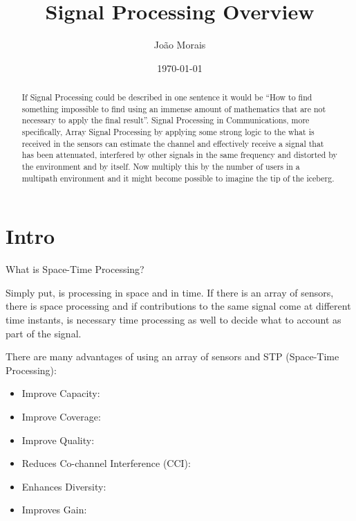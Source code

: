 \documentclass[12pt, a4paper]{article}
\title{Signal Processing Overview}
\author{
    João Morais
}
\date{\today}
\begin{document}
\maketitle

\begin{abstract}
    If Signal Processing could be described in one sentence it would be ``How to find something impossible to find using an immense amount of mathematics that are not necessary to apply the final result''. Signal Processing in Communications, more specifically, Array Signal Processing by applying some strong logic to the what is received in the sensors can estimate the channel and effectively receive a signal that has been attenuated, interfered by other signals in the same frequency and distorted by the environment and by itself. Now multiply this by the number of users in a multipath environment and it might become possible to imagine the tip of the iceberg. 
\end{abstract}

\newpage
\tableofcontents
\newpage

\section{Intro} \label{sec:intro}


\par What is Space-Time Processing?
\par Simply put, is processing in space and in time. If there is an array of sensors, there is space processing and if contributions to the same signal come at different time instants, is necessary time processing as well to decide what to account as part of the signal.

There are many advantages of using an array of sensors and STP (Space-Time Processing):
\begin{itemize}
    \item Improve Capacity:
    \item Improve Coverage:
    \item Improve Quality:
    \item Reduces Co-channel Interference (CCI):
    \item Enhances Diversity:
    \item Improves Gain:
\end{itemize}
\end{document}
